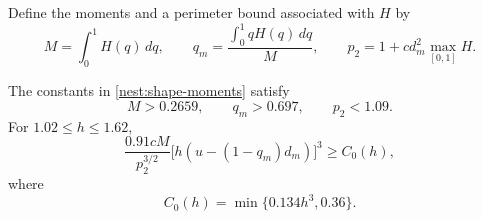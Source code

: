 Define the moments and a perimeter bound associated with $H$ by
\begin{equation}\label{nest:shape-moments}
 M=\int_0^1H(q)\,dq,\qquad
 q_m=\frac{\int_0^1qH(q)\,dq}{M},\qquad
 p_2=1+c d_m^2\max_{[0,1]}H.
\end{equation}

\begin{lemma}\label{nest:coefficient-bound}
The constants in \eqref{nest:shape-moments} satisfy
\begin{equation}\label{nest:moment-bounds}
 M>0.2659,\qquad q_m>0.697,\qquad p_2<1.09.
\end{equation}
For $1.02\leq h\leq1.62$,
\begin{equation}\label{nest:coefficient-inequality}
 \frac{0.91cM}{p_2^{3/2}}
       \bigl[h(u-(1-q_m)d_m)\bigr]^3
 \geq C_0(h),
\end{equation}
where
\begin{equation}\label{nest:gain-coefficient}
 C_0(h)=\min\{0.134h^3,0.36\}.
\end{equation}
\end{lemma}

